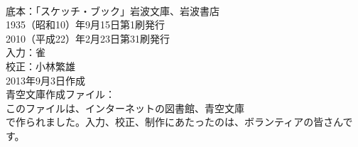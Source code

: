 \documentclass[8pt]{extreport}
\begin{document}
\begin{CJK}{UTF8}{min}
\\	底本：「スケッチ・ブック」岩波文庫、岩波書店
\\	1935（昭和10）年9月15日第1刷発行
\\	2010（平成22）年2月23日第31刷発行
\\	入力：雀
\\	校正：小林繁雄
\\	2013年9月3日作成
\\	青空文庫作成ファイル：
\\	このファイルは、インターネットの図書館、青空文庫
\\	で作られました。入力、校正、制作にあたったのは、ボランティアの皆さんです。
\end{CJK}
\end{document}
